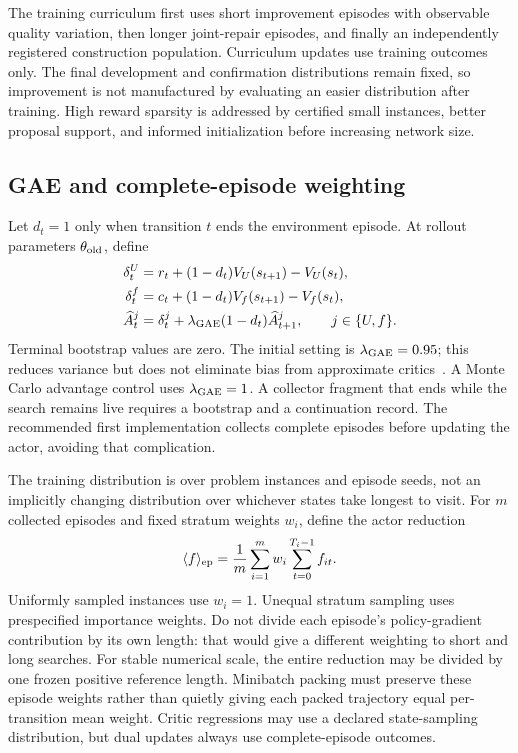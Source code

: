 The training curriculum first uses short improvement episodes with observable quality variation,
then longer joint-repair episodes, and finally an independently registered construction population.
Curriculum updates use training outcomes only. The final development and confirmation distributions
remain fixed, so improvement is not manufactured by evaluating an easier distribution after
training. High reward sparsity is addressed by certified small instances, better proposal support,
and informed initialization before increasing network size.

\subsection{GAE and complete-episode weighting}

Let \(d_t=1\) only when transition \(t\) ends the environment episode. At rollout parameters
\(\theta_{\rm old}\), define
\begin{align}
 \delta_t^U&=r_t+(1-d_t)V_U(s_{t+1})-V_U(s_t),\\
 \delta_t^f&=c_t+(1-d_t)V_f(s_{t+1})-V_f(s_t),\\
 \widehat A_t^j&=\delta_t^j+
 \lambda_{\rm GAE}(1-d_t)\widehat A_{t+1}^j,
 \qquad j\in\{U,f\}.
 \label{eq:rl-gae}
\end{align}
Terminal bootstrap values are zero. The initial setting is \(\lambda_{\rm GAE}=0.95\); this
reduces variance but does not eliminate bias from approximate critics~\cite{gae2016}. A
Monte Carlo advantage control uses \(\lambda_{\rm GAE}=1\). A collector fragment that ends while
the search remains live requires a bootstrap and a continuation record. The recommended first
implementation collects complete episodes before updating the actor, avoiding that complication.

The training distribution is over problem instances and episode seeds, not an implicitly changing
distribution over whichever states take longest to visit. For \(m\) collected episodes and fixed
stratum weights \(w_i\), define the actor reduction
\begin{equation}
 \langle f\rangle_{\rm ep}=
 \frac{1}{m}\sum_{i=1}^{m}w_i\sum_{t=0}^{T_i-1}f_{it}.
 \label{eq:rl-episode-reduction}
\end{equation}
Uniformly sampled instances use \(w_i=1\). Unequal stratum sampling uses prespecified importance
weights. Do not divide each episode's policy-gradient contribution by its own length: that would
give a different weighting to short and long searches. For stable numerical scale, the entire
reduction may be divided by one frozen positive reference length. Minibatch packing must preserve
these episode weights rather than quietly giving each packed trajectory equal per-transition mean
weight. Critic regressions may use a declared state-sampling distribution, but dual updates always
use complete-episode outcomes.

